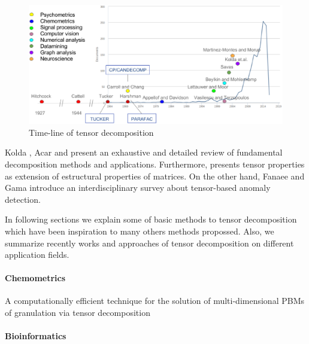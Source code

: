 \documentclass[letterpaper,12pt]{article}
\begin{document}
\begin{figure}[!ht]
\centering
 \includegraphics[scale=0.5]{Images/time-line.eps}
 \caption{Time-line of tensor decomposition}\label{fig:applications}
\end{figure}




Kolda \cite{Kolda2009}, Acar \cite{Acar2009} and \cite{Comon2014} present an exhaustive and detailed review of fundamental decomposition methods and applications. Furthermore, \cite{Dartois2016} presents tensor properties as extension of estructural properties of matrices. On the other hand, Fanaee and Gama \cite{Fanaee-T2016} introduce an interdisciplinary survey about tensor-based anomaly detection.

In following sections we explain some of basic methods to tensor decomposition which have been inspiration to many others methods propossed. Also, we summarize recently  works and approaches of tensor decomposition on different application fields.

\paragraph{Chemometrics}

\cite{Chaudhury2014} A computationally efficient technique for the solution of multi-dimensional PBMs of granulation via tensor decomposition

\paragraph{Bioinformatics}
\end{document}
